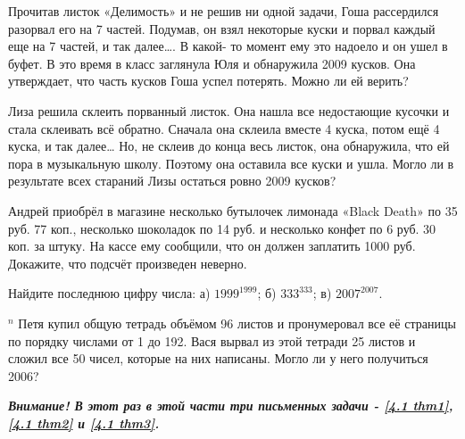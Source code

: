 \begin{thm}
    Прочитав листок «Делимость» и не решив ни одной задачи, Гоша рассердился разорвал его
    на 7 частей. Подумав, он взял некоторые куски и порвал каждый еще на 7 частей, и так далее…. В какой-
    то момент ему это надоело и он ушел в буфет. В это время в класс заглянула Юля и обнаружила 2009
    кусков. Она утверждает, что часть кусков Гоша успел потерять. Можно ли ей верить?
\end{thm}

\begin{thm}
    Лиза решила склеить порванный листок. Она нашла все недостающие кусочки и стала
склеивать всё обратно. Сначала она склеила вместе 4 куска, потом ещё 4 куска, и так
далее… Но, не склеив до конца весь листок, она обнаружила, что ей пора в музыкальную школу. Поэтому она оставила все куски и ушла. Могло ли в результате всех стараний Лизы остаться ровно 2009 кусков?
\end{thm}

\begin{thm}
    Андрей приобрёл в магазине несколько бутылочек лимонада «Black Death» по 35 руб. 77 коп.,
несколько шоколадок по 14 руб. и несколько конфет по 6 руб. 30 коп. за штуку. На кассе ему сообщили, что он должен заплатить 1000 руб. Докажите, что подсчёт произведен неверно.
\end{thm}

\begin{thm}
    Найдите последнюю цифру числа: а) $1999^{1999}$; б) $333^{333}$; в) $2007^{2007}$.
\end{thm}

\begin{thm}$^n$ \label{4.1 thm3}
    Петя купил общую тетрадь объёмом 96 листов и пронумеровал все её страницы по порядку числами от 1 до 192. Вася вырвал из этой тетради 25 листов и сложил все 50 чисел, которые на них написаны. Могло ли у него получиться 2006?
\end{thm}

\textbf{\textit{Внимание! В этот раз в этой части три письменных задачи - \ref{4.1 thm1}, \ref{4.1 thm2} и \ref{4.1 thm3}.}}